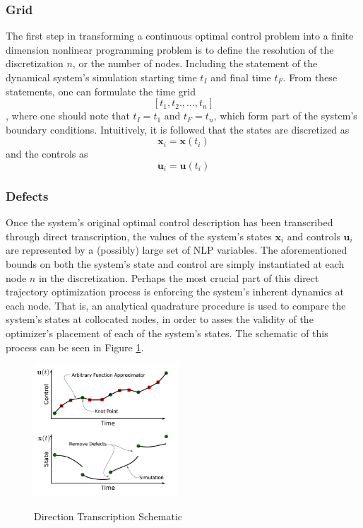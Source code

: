 \documentclass{article}
\begin{document}
\subsubsection{Grid}
The first step in transforming a continuous optimal control problem into a finite dimension nonlinear programming problem is to define the resolution of the discretization $n$, or the number of nodes. Including the statement of the dynamical system's simulation starting time $t_I$ and final time $t_F$. From these statements, one can formulate the time grid
$$
[t_1,t_2.,\dots,t_n]
$$,
where one should note that $t_I = t_1$ and $t_F = t_n$, which form part of the system's boundary conditions. Intuitively, it is followed that the states are discretized as 
$$
\mathbf{x}_i = \mathbf{x}(t_i)
$$
and the controls as
$$
\mathbf{u}_i = \mathbf{u}(t_i)
$$

\subsubsection{Defects}
Once the system's original optimal control description has been transcribed through direct transcription, the values of the system's states $\mathbf{x}_i$ and controls $\mathbf{u}_i$ are represented by a (possibly) large set of NLP variables. The aforementioned bounds on both the system's state and control are simply instantiated at each node $n$ in the discretization. Perhaps the most crucial part of this direct trajectory optimization process is enforcing the system's inherent dynamics at each node. That is, an analytical quadrature procedure is used to compare the system's states at collocated nodes, in order to asses the validity of the optimizer's placement of each of the system's states. The schematic of this process can be seen in Figure \ref{fig:trajopt}.

\begin{figure}
    \centering
    \includegraphics[width=0.48\textwidth]{pics/trajopt.png}
    \caption{Direction Transcription Schematic}
    \label{fig:trajopt}
    \cite{Nagy2001}
\end{figure}
\end{document}
